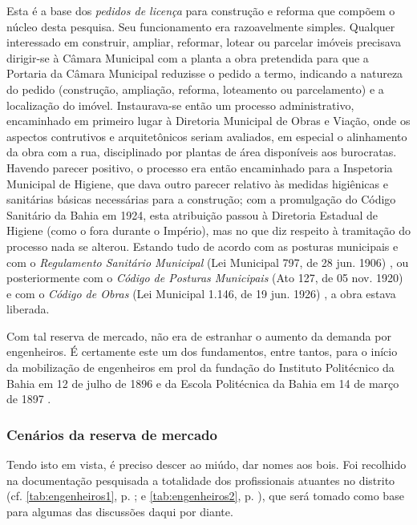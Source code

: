 Esta é a base dos \textit{pedidos de licença} para construção e reforma que compõem o núcleo desta pesquisa. Seu funcionamento era razoavelmente simples. Qualquer interessado em construir, ampliar, reformar, lotear ou parcelar imóveis precisava dirigir-se à Câmara Municipal com a planta a obra pretendida para que a Portaria da Câmara Municipal reduzisse o pedido a termo, indicando a natureza do pedido (construção, ampliação, reforma, loteamento ou parcelamento) e a localização do imóvel. Instaurava-se então um processo administrativo, encaminhado em primeiro lugar à Diretoria Municipal de Obras e Viação, onde os aspectos contrutivos e arquitetônicos seriam avaliados, em especial o alinhamento da obra com a rua, disciplinado por plantas de área disponíveis aos burocratas. Havendo parecer positivo, o processo era então encaminhado para a Inspetoria Municipal de Higiene, que dava outro parecer relativo às medidas higiênicas e sanitárias básicas necessárias para a construção; com a promulgação do Código Sanitário da Bahia em 1924, esta atribuição passou à Diretoria Estadual de Higiene (como o fora durante o Império), mas no que diz respeito à tramitação do processo nada se alterou. Estando tudo de acordo com as posturas municipais e com o \textit{Regulamento Sanitário Municipal} (Lei Municipal 797, de 28 jun. 1906) \cite{prefeitura_sanitario_1906}, ou posteriormente com o \textit{Código de Posturas Municipais} (Ato 127, de 05 nov. 1920) \cite{PREFEITURA1921} e com o \textit{Código de Obras} (Lei Municipal 1.146, de 19 jun. 1926) \cite{prefeitura_obras_1927}, a obra estava liberada.

Com tal reserva de mercado, não era de estranhar o aumento da demanda por engenheiros. É certamente este um dos fundamentos, entre tantos, para o início da mobilização de engenheiros em prol da fundação do Instituto Politécnico da Bahia em 12 de julho de 1896 e da Escola Politécnica da Bahia em 14 de março de 1897 \cite[pp.~9-11]{costa_politecnica_2005}. 

\subsubsection{Cenários da reserva de mercado}\label{subsubsec:cenresermerc}

Tendo isto em vista, é preciso descer ao miúdo, dar nomes aos bois. Foi recolhido na documentação pesquisada a totalidade dos profissionais atuantes no distrito (cf. \autoref{tab:engenheiros1}, p. \pageref{tab:engenheiros1}; e \autoref{tab:engenheiros2}, p. \pageref{tab:engenheiros2}), que será tomado como base para algumas das discussões daqui por diante.

